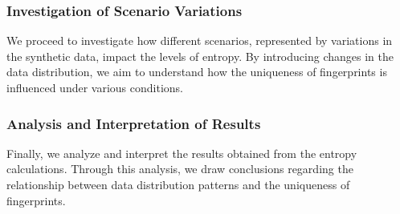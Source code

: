 


\subsubsection{Investigation of Scenario Variations}

We proceed to investigate how different scenarios, represented by variations in the synthetic data, impact the levels of entropy. By introducing changes in the data distribution, we aim to understand how the uniqueness of fingerprints is influenced under various conditions.

\subsubsection{Analysis and Interpretation of Results}

Finally, we analyze and interpret the results obtained from the entropy calculations. Through this analysis, we draw conclusions regarding the relationship between data distribution patterns and the uniqueness of fingerprints. 












